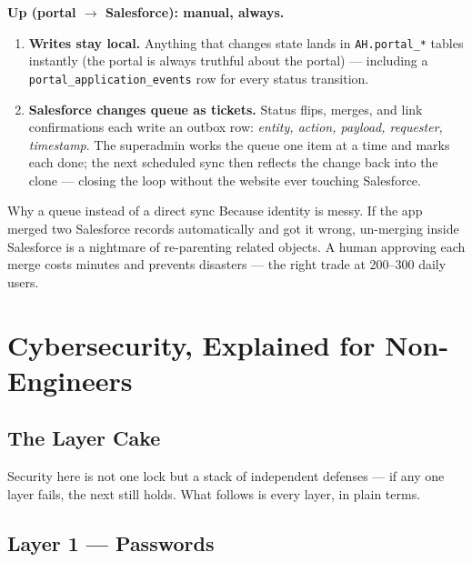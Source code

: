 \documentclass[11pt,letterpaper]{report}
\begin{document}
\textbf{Up (portal $\rightarrow$ Salesforce): manual, always.}
\begin{enumerate}[leftmargin=1.6em]
  \item \textbf{Writes stay local.} Anything that changes state lands in
        \texttt{AH.portal\_*} tables instantly (the portal is always truthful
        about the portal) --- including a \texttt{portal\_application\_events}
        row for every status transition.
  \item \textbf{Salesforce changes queue as tickets.} Status flips, merges, and
        link confirmations each write an outbox row: \emph{entity, action,
        payload, requester, timestamp}. The superadmin works the queue one item
        at a time and marks each done; the next scheduled sync then reflects
        the change back into the clone --- closing the loop without the
        website ever touching Salesforce.
\end{enumerate}

\begin{keybox}{Why a queue instead of a direct sync}
Because identity is messy. If the app merged two Salesforce records
automatically and got it wrong, un-merging inside Salesforce is a nightmare of
re-parenting related objects. A human approving each merge costs minutes and
prevents disasters --- the right trade at 200--300 daily users.
\end{keybox}

\chapter{Cybersecurity, Explained for Non-Engineers}

\section{The Layer Cake}

Security here is not one lock but a stack of independent defenses --- if any one
layer fails, the next still holds. What follows is every layer, in plain terms.

\section{Layer 1 --- Passwords}
\end{document}
